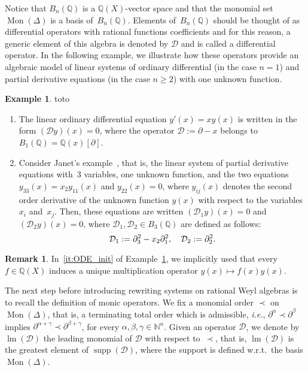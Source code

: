 \documentclass[10pt]{easychair}
\theoremstyle{definition}
\newtheorem{remark}[theorem]{Remark}
\newtheorem{example}[theorem]{Example}
\newcommand\ie{\emph{i.e.}}
\DeclareMathOperator{\supp}{supp}
\newcommand\D{\mathcal{D}}
\DeclareMathOperator{\lm}{lm}
\newcommand\Q{\mathbb{Q}}
\newcommand\N{\mathbb{N}}
\newcommand\Weyl[1]{B_{#1}(\Q)}
\newcommand\monBasis{\Mon(\Delta)}
\DeclareMathOperator{\Mon}{Mon}
\begin{document}
Notice that $\Weyl{n}$ is a $\Q(X)$-vector space and that the monomial 
set $\monBasis$ is a basis of~$\Weyl{n}$. Elements of~$\Weyl{n}$ should 
be thought of as differential operators with rational functions 
coefficients and for this reason, a generic element of this algebra is
denoted by $\D$ and is called a differential operator. In the following
example, we illustrate how these operators provide an algebraic model of
linear systems of ordinary differential (in the case $n=1$) and partial
derivative equations (in the case $n\geq 2$) with one unknown function. 
\smallskip

\begin{example}\label{ex:diff_operators_init}
  {\color{white}toto}
  \begin{enumerate}
  \item\label{it:ODE_init} The linear ordinary differential equation
    $y'(x)=xy(x)$ is written in the form $(\D y)(x)=0$, where the operator
    $\D:=\partial-x$ belongs to $\Weyl{1}=\Q(x)[\partial]$. 
  \item\label{it:Janet_example_init} Consider Janet's
    example~\cite{MR1308976}, that is, the linear system of partial
    derivative equations with~$3$ variables, one unknown function, and
    the two equations $y_{33}(x)=x_2y_{11}(x)$ and $y_{22}(x)=0$, where
    $y_{ij}(x)$ denotes the second order derivative of the unknown
    function $y(x)$ with respect to the variables $x_i$ and~$x_j$. Then,
    these equations are written $(\D_1y)(x)=0$ and $(\D_2y)(x)=0$, where
    $\D_1,\D_2\in\Weyl{3}$ are defined as follows:
    \[\D_1:=\partial_3^2-x_2\partial_1^2,\quad \D_2:=\partial_2^2.
    \smallskip\]
  \end{enumerate}
\end{example}

\begin{remark}
  In~\ref{it:ODE_init} of Example~\ref{ex:diff_operators_init}, we
  implicitly used that every $f\in\Q(X)$ induces a unique multiplication
  operator $y(x)\mapsto f(x)y(x)$.
\end{remark}
\smallskip

The next step before introducing rewriting systems on rational Weyl
algebras is to recall the definition of monic operators. We fix a
monomial order $\prec$ on $\monBasis$, that is, a terminating total 
order which is admissible, \ie, $\partial^{\alpha}\prec\partial^{\beta}$
implies $\partial^{\alpha+\gamma}\prec\partial^{\beta+\gamma}$, for every
$\alpha,\beta,\gamma\in\N^n$. Given an operator $\D$, we denote by
$\lm(\D)$ the leading monomial of $\D$ with respect to~$\prec$, that 
is, $\lm(\D)$ is the greatest element of $\supp(\D)$, where the support 
is defined w.r.t.\ the basis $\monBasis$. 
\smallskip
\end{document}
